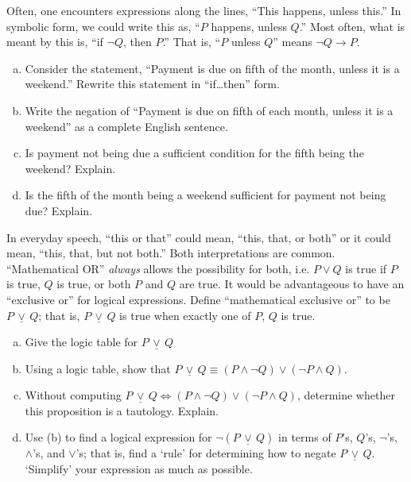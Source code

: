 \documentclass[11pt,letterpaper]{article}
\newcommand{\xor}{\,\underline{\vee}\,}
\begin{document}

 Often, one encounters expressions along the lines, ``This happens, unless this.'' In symbolic form, we could write this as, ``$P$ happens, unless $Q$.'' Most often, what is meant by this is, ``if $\neg Q$, then $P$.'' That is, ``$P$ unless $Q$'' means $\neg Q \to P$. 
	\begin{enumerate}[(a)]
	\item Consider the statement, ``Payment is due on fifth of the month, unless it is a weekend.'' Rewrite this statement in ``if\dots then'' form.  
	\item Write the negation of ``Payment is due on fifth of each month, unless it is a weekend'' as a complete English sentence. 
	\item Is payment not being due a sufficient condition for the fifth being the weekend? Explain. 
	\item Is the fifth of the month being a weekend sufficient for payment not being due? Explain. 
	\end{enumerate}



\newpage



 In everyday speech, ``this or that'' could mean, ``this, that, or both'' or it could mean, ``this, that, but not both.'' Both interpretations are common. ``Mathematical OR'' \textit{always} allows the possibility for both, i.e. $P \vee Q$ is true if $P$ is true, $Q$ is true, or both $P$ and $Q$ are true. It would be advantageous to have an ``exclusive or'' for logical expressions. Define ``mathematical exclusive or'' to be $P \xor Q$; that is, $P \xor Q$ is true when exactly one of $P$, $Q$ is true. 
	\begin{enumerate}[(a)]
	\item Give the logic table for $P \xor Q$
	\item Using a logic table, show that $P \xor Q \equiv (P \wedge \neg Q) \vee (\neg P \wedge Q)$.
	\item Without computing $P \xor Q \iff (P \wedge \neg Q) \vee (\neg P \wedge Q)$, determine whether this proposition is a tautology. Explain. 
	\item Use (b) to find a logical expression for $\neg (P \xor Q)$ in terms of $P$'s, $Q$'s, $\neg$'s, $\wedge$'s, and $\vee$'s; that is, find a `rule' for determining how to negate $P \xor Q$. `Simplify' your expression as much as possible. 	
	\end{enumerate}
\end{document}
